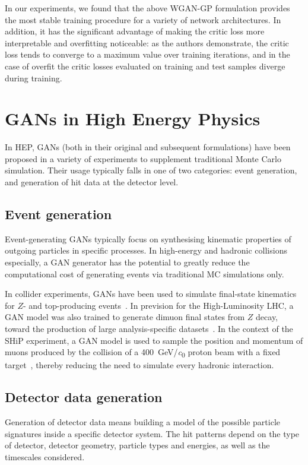In our experiments, we found that the above WGAN-GP formulation provides the
most stable training procedure for a variety of network architectures. In
addition, it has the significant advantage of making the critic loss more
interpretable and overfitting noticeable: as the authors demonstrate, the critic
loss tends to converge to a maximum value over training iterations, and in the
case of overfit the critic losses evaluated on training and test samples
diverge during training.

\section{GANs in High Energy Physics}
In HEP, GANs (both in their original and subsequent formulations) have been
proposed in a variety of experiments to supplement traditional Monte Carlo
simulation. Their usage typically falls in one of two categories: event
generation, and generation of hit data at the detector level.

\subsection{Event generation}
Event-generating GANs typically focus on synthesising kinematic properties of
outgoing particles in specific processes. In high-energy and hadronic collisions
especially, a GAN generator has the potential to greatly reduce the
computational cost of generating events via traditional MC simulations only.

In collider experiments, GANs have been used to simulate final-state kinematics
for $Z$- and top-producing events~\cite{butter_how_2019, otten_event_2019}. In
prevision for the High-Luminosity LHC, a GAN model was also trained to generate
dimuon final states from $Z$ decay, toward the production of large
analysis-specific datasets~\cite{hashemi2019lhc}. In the context of the SHiP
experiment, a GAN model is used to sample the position and momentum of muons
produced by the collision of a \SI{400}{\GeV/\clight} proton beam with a fixed
target~\cite{ahdida_fast_2019}, thereby reducing the need to simulate every
hadronic interaction.


\subsection{Detector data generation}
Generation of detector data means building a model of the possible particle
signatures inside a specific detector system. The hit patterns depend on the
type of detector, detector geometry, particle types and energies, as well as the
timescales considered.

